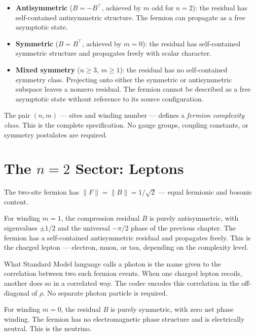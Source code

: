 \begin{itemize}
    \item \textbf{Antisymmetric} ($B = -B^\top$, achieved by $m$ odd
    for $n = 2$): the residual has self-contained antisymmetric
    structure. The fermion can propagate as a free asymptotic state.

    \item \textbf{Symmetric} ($B = B^\top$, achieved by $m = 0$):
    the residual has self-contained symmetric structure and propagates
    freely with scalar character.

    \item \textbf{Mixed symmetry} ($n \geq 3$, $m \geq 1$): the
    residual has no self-contained symmetry class. Projecting onto
    either the symmetric or antisymmetric subspace leaves a nonzero
    residual. The fermion cannot be described as a free asymptotic
    state without reference to its source configuration.
\end{itemize}

The pair $(n, m)$ --- sites and winding number --- defines a
\emph{fermion complexity class}. This is the complete specification.
No gauge groups, coupling constants, or symmetry postulates are
required.

\section{The $n = 2$ Sector: Leptons}

The two-site fermion has $\|F\| = \|B\| = 1/\sqrt{2}$ --- equal
fermionic and bosonic content.

For winding $m = 1$, the compression residual $B$ is purely
antisymmetric, with eigenvalues $\pm 1/2$ and the universal $-\pi/2$
phase of the previous chapter. The fermion has a self-contained
antisymmetric residual and propagates freely. This is the charged
lepton --- electron, muon, or tau, depending on the complexity level.

What Standard Model language calls a photon is the name given to the
correlation between two such fermion events. When one charged lepton
recoils, another does so in a correlated way. The codec encodes this
correlation in the off-diagonal of $\rho$. No separate photon particle
is required.

For winding $m = 0$, the residual $B$ is purely symmetric, with zero
net phase winding. The fermion has no electromagnetic phase structure
and is electrically neutral. This is the neutrino.

